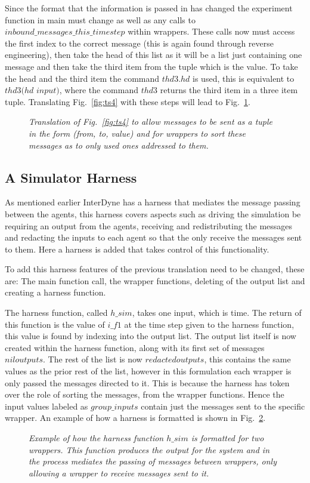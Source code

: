 \documentclass{article}
\begin{document}
Since the format that the information is passed in has changed the experiment function in main must change as well as any calls to $inbound\_messages\_this\_timestep$ within wrappers. These calls now must access the first index to the correct message (this is again found through reverse engineering), then take the head of this list as it will be a list just containing one message and then take the third item from the tuple which is the value. To take the head and the third item the command $thd3.hd$ is used, this is equivalent to $thd3(hd$ $input)$, where the command $thd3$ returns the third item in a three item tuple. Translating Fig.~\ref{fig:ts4} with these steps will lead to Fig.~\ref{fig:ts5}.
\begin{figure}[H]
	\centering
	
	\caption{\it Translation of Fig.~\ref{fig:ts4} to allow messages to be sent as a tuple in the form (from, to, value) and for wrappers to sort these messages as to only used ones addressed to them.}
	\label{fig:ts5}
\end{figure} 

\subsection{A Simulator Harness}
As mentioned earlier InterDyne has a harness that mediates the message passing between the agents, this harness covers aspects such as driving the simulation be requiring an output from the agents, receiving and redistributing the messages and redacting the inputs to each agent so that the only receive the messages sent to them. Here a harness is added that takes control of this functionality. 

To add this harness features of the previous translation need to be changed, these are: The main function call, the wrapper functions, deleting of the output list and creating a harness function. 

The harness function, called $h\_sim$, takes one input, which is time. The return of this function is the value of $i\_f1$ at the time step given to the harness function, this value is found by indexing into the output list. The output list itself is now created within the harness function, along with its first set of messages $niloutputs$. The rest of the list is now $redactedoutputs$, this contains the same values as the prior rest of the list, however in this formulation each wrapper is only passed the messages directed to it. This is because the harness has token over the role of sorting the messages, from the wrapper functions. Hence the input values labeled as $group\_inputs$ contain just the messages sent to the specific wrapper. An example of how a harness is formatted is shown in Fig.~\ref{fig:harn6}.
\begin{figure}[H]
	\centering
	
	\caption{\it Example of how the harness function $h\_sim$ is formatted for two wrappers. This function produces the output for the system and in the process mediates the passing of messages between wrappers, only allowing a wrapper to receive messages sent to it.}
	\label{fig:harn6}
\end{figure} 
\end{document}
